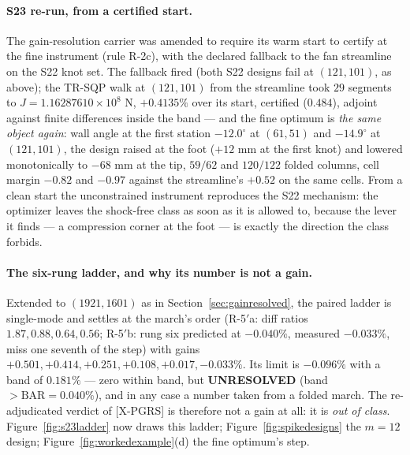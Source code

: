 \paragraph{S23 re-run, from a certified start.} The gain-resolution
carrier was amended to require its warm start to certify at the fine
instrument (rule R-2c), with the declared fallback to the fan
streamline on the S22 knot set. The fallback fired (both S22 designs
fail at $(121,101)$, as above); the TR-SQP walk at $(121,101)$ from
the streamline took $29$ segments to $J = 1.16287610\times10^{8}$ N,
$+0.4135\%$ over its start, certified ($0.484$), adjoint against
finite differences inside the band --- and the fine optimum is
\emph{the same object again}: wall angle at the first station
$-12.0^\circ$ at $(61,51)$ and $-14.9^\circ$ at $(121,101)$, the
design raised at the foot ($+12$ mm at the first knot) and lowered
monotonically to $-68$ mm at the tip, $59/62$ and $120/122$ folded
columns, cell margin $-0.82$ and $-0.97$ against the streamline's
$+0.52$ on the same cells. From a clean start the unconstrained
instrument reproduces the S22 mechanism: the optimizer leaves the
shock-free class as soon as it is allowed to, because the lever it
finds --- a compression corner at the foot --- is exactly the
direction the class forbids.

\paragraph{The six-rung ladder, and why its number is not a gain.}
Extended to $(1921,1601)$ as in Section~\ref{sec:gainresolved}, the
paired ladder is single-mode and settles at the march's order
(R-5$'$a: diff ratios $1.87, 0.88, 0.64, 0.56$; R-5$'$b: rung six
predicted at $-0.040\%$, measured $-0.033\%$, miss one seventh of
the step) with gains $+0.501, +0.414, +0.251, +0.108, +0.017,
-0.033\%$. Its limit is $-0.096\%$ with a band of $0.181\%$ ---
zero within band, but \textbf{UNRESOLVED} (band $> \mathrm{BAR} =
0.040\%$), and in any case a number taken from a folded march. The
re-adjudicated verdict of [X-PGRS] is therefore not a gain at all:
it is \emph{out of class}. Figure~\ref{fig:s23ladder} now draws this
ladder; Figure~\ref{fig:spikedesigns} the $m = 12$ design;
Figure~\ref{fig:workedexample}(d) the fine optimum's step.

